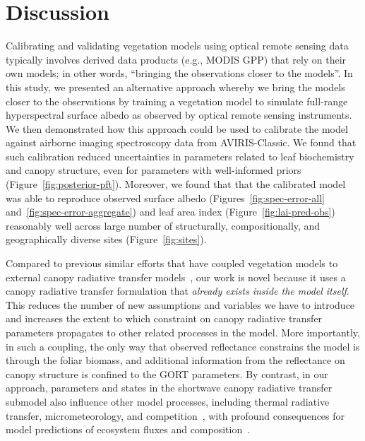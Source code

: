 \section{Discussion}

Calibrating and validating vegetation models using optical remote sensing data typically involves derived data products (e.g., MODIS GPP) that rely on their own models;
in other words, ``bringing the observations closer to the models''.
In this study, we presented an alternative approach whereby we bring the models closer to the observations by training a vegetation model to simulate full-range hyperspectral surface albedo as observed by optical remote sensing instruments.
We then demonstrated how this approach could be used to calibrate the model against airborne imaging spectroscopy data from AVIRIS-Classic.
We found that such calibration reduced uncertainties in parameters related to leaf biochemistry and canopy structure, even for parameters with well-informed priors (Figure~\ref{fig:posterior-pft}).
Moreover, we found that that the calibrated model was able to reproduce observed surface albedo (Figures~\ref{fig:spec-error-all} and~\ref{fig:spec-error-aggregate}) and leaf area index (Figure~\ref{fig:lai-pred-obs}) reasonably well across large number of structurally, compositionally, and geographically diverse sites (Figure~\ref{fig:sites}).

Compared to previous similar efforts that have coupled vegetation models to external canopy radiative transfer models~\citep{knorr2001assimilation, nouvellon2001coupling, quaife2008assimilating},
our work is novel because it uses a canopy radiative transfer formulation that \emph{already exists inside the model itself}.
This reduces the number of new assumptions and variables we have to introduce and increases the extent to which constraint on canopy radiative transfer parameters propagates to other related processes in the model.
More importantly, in such a coupling, the only way that observed reflectance constrains the model is through the foliar biomass, and additional information from the reflectance on canopy structure is confined to the GORT parameters.
By contrast, in our approach, parameters and states in the shortwave canopy radiative transfer submodel also influence other model processes, including thermal radiative transfer, micrometeorology, and competition~\citep{longo2019ed2description}, with profound consequences for model predictions of ecosystem fluxes and composition~\citep{viskari_2019_influence}.

